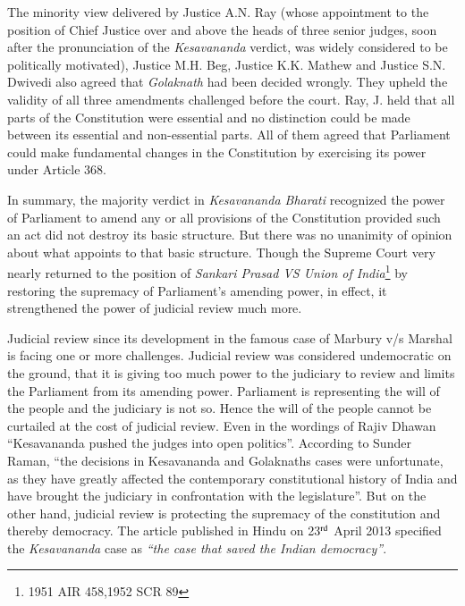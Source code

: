 \begin{multicols}{2}
\noi
{}

\noi
The minority view delivered by Justice A.N. Ray (whose appointment to the position
of Chief Justice over and above the heads of three senior judges, soon after the
pronunciation of the \textit{Kesavananda} verdict, was widely considered to be politically motivated), Justice M.H. Beg, Justice K.K. Mathew and Justice S.N. Dwivedi also
agreed that \textit{Golaknath} had been decided wrongly. They upheld the validity of all three
amendments challenged before the court. Ray, J. held that all parts of the
Constitution were essential and no distinction could be made between its essential and
non-essential parts. All of them agreed that Parliament could make fundamental
changes in the Constitution by exercising its power under Article 368.

\noi
In summary, the majority verdict in \textit{Kesavananda Bharati} recognized the power
of Parliament to amend any or all provisions of the Constitution provided such an act
did not destroy its basic structure. But there was no unanimity of opinion about what
appoints to that basic structure. Though the Supreme Court very nearly returned to the
position of \textit{Sankari Prasad VS Union of India}\footnote{1951 AIR 458,1952 SCR 89} by restoring the supremacy of
Parliament's amending power, in effect, it strengthened the power of judicial review
much more.

\noi
{}

\noi
Judicial review since its development in the famous case of Marbury v/s Marshal is
facing one or more challenges. Judicial review was considered undemocratic on the
ground, that it is giving too much power to the judiciary to review and limits the
Parliament from its amending power. Parliament is representing the will of the people
and the judiciary is not so. Hence the will of the people cannot be curtailed at the cost
of judicial review. Even in the wordings of Rajiv Dhawan “Kesavananda pushed the
judges into open politics”. According to Sunder Raman, “the decisions in Kesavananda
and Golaknaths cases were unfortunate, as they have greatly affected the contemporary
constitutional history of India and have brought the judiciary in confrontation with the
legislature”. But on the other hand, judicial review is protecting the supremacy of the
constitution and thereby democracy. The article published in Hindu on 23$^{\rm rd}$ April 2013
specified the \textit{Kesavananda} case as \textit{“the case that saved the Indian democracy”}.


\end{multicols}
